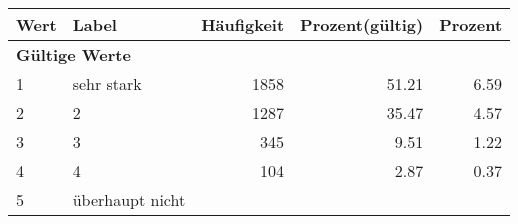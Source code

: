      \begin{longtable}{lXrrr}
     \toprule
     \textbf{Wert} & \textbf{Label} & \textbf{Häufigkeit} & \textbf{Prozent(gültig)} & \textbf{Prozent} \\
     \endhead
     \midrule
     \multicolumn{5}{l}{\textbf{Gültige Werte}}\\

     1 &
     \multicolumn{1}{X}{ sehr stark   } &


       \num{1858} &
       \num[round-mode=places,round-precision=2]{51.21} &
         \num[round-mode=places,round-precision=2]{6.59} \\

     2 &
     \multicolumn{1}{X}{ 2   } &


       \num{1287} &
       \num[round-mode=places,round-precision=2]{35.47} &
         \num[round-mode=places,round-precision=2]{4.57} \\

     3 &
     \multicolumn{1}{X}{ 3   } &


       \num{345} &
       \num[round-mode=places,round-precision=2]{9.51} &
         \num[round-mode=places,round-precision=2]{1.22} \\

     4 &
     \multicolumn{1}{X}{ 4   } &


       \num{104} &
       \num[round-mode=places,round-precision=2]{2.87} &
         \num[round-mode=places,round-precision=2]{0.37} \\

     5 &
     \multicolumn{1}{X}{ überhaupt nicht   } &



\end{longtable}
